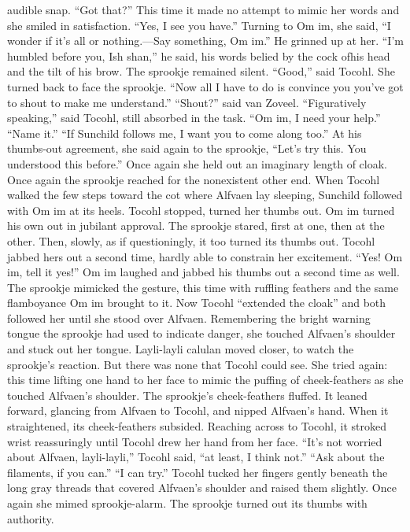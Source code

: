 \documentclass[9pt]{article}
\begin{document}
audible snap. “Got that?” This time it made no attempt to mimic her words and she smiled in satisfaction.
“Yes, I see you have.”
Turning to Om im, she said, “I wonder if it’s all or nothing.—Say something, Om im.”
He grinned up at her. “I’m humbled before you, Ish shan,” he said, his words belied by the cock ofhis head and the tilt of his brow.
The sprookje remained silent.
“Good,” said Tocohl. She turned back to face the sprookje. “Now all I have to do is convince you
you’ve got to shout to make me understand.”
“Shout?” said van Zoveel.
“Figuratively speaking,” said Tocohl, still absorbed in the task. “Om im, I need your help.”
“Name it.”
“If Sunchild follows me, I want you to come along too.” At his thumbs-out agreement, she said again
to the sprookje, “Let’s try this. You understood this before.” Once again she held out an imaginary length
of cloak. Once again the sprookje reached for the nonexistent other end.
When Tocohl walked the few steps toward the cot where Alfvaen lay sleeping, Sunchild followed
with Om im at its heels. Tocohl stopped, turned her thumbs out.
Om im turned his own out in jubilant approval.
The sprookje stared, first at one, then at the other. Then, slowly, as if questioningly, it too turned its
thumbs out. Tocohl jabbed hers out a second time, hardly able to constrain her excitement. “Yes! Om
im, tell it yes!” Om im laughed and jabbed his thumbs out a second time as well.
The sprookje mimicked the gesture, this time with ruffling feathers and the same flamboyance Om im
brought to it.
Now Tocohl “extended the cloak” and both followed her until she stood over Alfvaen. Remembering
the bright warning tongue the sprookje had used to indicate danger, she touched Alfvaen’s shoulder and
stuck out her tongue. Layli-layli calulan moved closer, to watch the sprookje’s reaction.
But there was none that Tocohl could see. She tried again: this time lifting one hand to her face to
mimic the puffing of cheek-feathers as she touched Alfvaen’s shoulder. The sprookje’s cheek-feathers
fluffed. It leaned forward, glancing from Alfvaen to Tocohl, and nipped Alfvaen’s hand.
When it straightened, its cheek-feathers subsided. Reaching across to Tocohl, it stroked wrist
reassuringly until Tocohl drew her hand from her face. “It’s not worried about Alfvaen, layli-layli,”
Tocohl said, “at least, I think not.”
“Ask about the filaments, if you can.”
“I can try.” Tocohl tucked her fingers gently beneath the long gray threads that covered Alfvaen’s
shoulder and raised them slightly. Once again she mimed sprookje-alarm.
The sprookje turned out its thumbs with authority.
\end{document}
